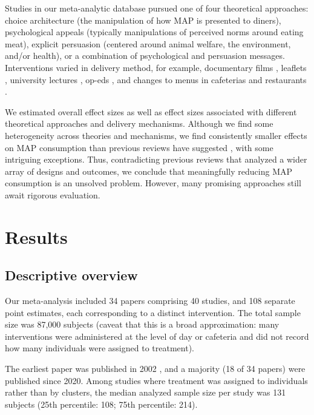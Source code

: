 \documentclass[sn-nature,referee,pdflatex]{sn-jnl}
\begin{document}
Studies in our meta-analytic database pursued one of four theoretical
approaches: choice architecture (the manipulation of how MAP is
presented to diners), psychological appeals (typically manipulations of
perceived norms around eating meat), explicit persuasion (centered
around animal welfare, the environment, and/or health), or a combination
of psychological and persuasion messages. Interventions varied in
delivery method, for example, documentary films
\citep{mathur2021effectiveness}, leaflets \citep{peacock2017},
university lectures \citep{jalil2023}, op-eds \citep{haile2021}, and
changes to menus in cafeterias \citep{andersson2021} and restaurants
\citep{coker2022, sparkman2021}.

We estimated overall effect sizes as well as effect sizes associated
with different theoretical approaches and delivery mechanisms. Although
we find some heterogeneity across theories and mechanisms, we find
consistently smaller effects on MAP consumption than previous reviews
have suggested
\citep{bianchi2018restructuring, byerly2018, chang2023, harguess2020, kwasny2022, mathur2021meta, meier2022, pandey2023},
with some intriguing exceptions. Thus, contradicting previous reviews
that analyzed a wider array of designs and outcomes, we conclude that
meaningfully reducing MAP consumption is an unsolved problem. However,
many promising approaches still await rigorous evaluation.

\section{Results}\label{sec2}

\subsection{Descriptive overview}\label{descriptive-overview}

Our meta-analysis included 34 papers comprising 40 studies, and 108
separate point estimates, each corresponding to a distinct intervention.
The total sample size was 87,000 subjects (caveat that this is a broad
approximation: many interventions were administered at the level of day
or cafeteria and did not record how many individuals were assigned to
treatment).

The earliest paper was published in 2002 \citep{allen2002}, and a
majority (18 of 34 papers) were published since 2020. Among studies
where treatment was assigned to individuals rather than by clusters, the
median analyzed sample size per study was 131 subjects (25th percentile:
108; 75th percentile: 214).
\end{document}
